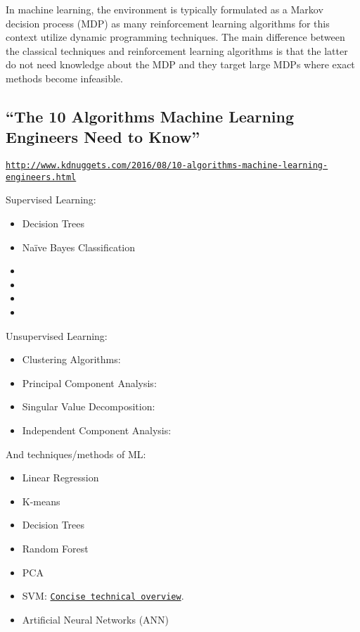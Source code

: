 \documentclass[11pt]{article}
\begin{document}
In machine learning, the environment is typically formulated as a
Markov decision process (MDP) as many reinforcement learning
algorithms for this context utilize dynamic programming
techniques. The main difference between the classical techniques and
reinforcement learning algorithms is that the latter do not need
knowledge about the MDP and they target large MDPs where exact methods
become infeasible.


\subsection*{``The 10 Algorithms Machine Learning Engineers Need to Know''}

\smallskip \smallskip
\noindent
\href{http://www.kdnuggets.com/2016/08/10-algorithms-machine-learning-engineers.html}{{\tt http://www.kdnuggets.com/2016/08/10-algorithms-machine-learning-engineers.html}}

Supervised Learning:\\
\begin{itemize}
\item{Decision Trees}
\item{Naïve Bayes Classification}
\item{}
\item{}
\item{}
\item{}
\end{itemize}

Unsupervised Learning:\\
\begin{itemize}
\item{Clustering Algorithms:}
\item{Principal Component Analysis:}
\item{Singular Value Decomposition:}
\item{Independent Component Analysis:}
\end{itemize}



And techniques/methods of ML:
\begin{itemize}
\item{Linear Regression}
\item{K-means} 
\item{Decision Trees}
\item{Random Forest}
\item{PCA}
\item{SVM: 
\href{http://www.kdnuggets.com/2016/09/support-vector-machines-concise-technical-overview.html}{\tt Concise technical overview}. } 
\item{Artificial Neural Networks (ANN)}
\end{itemize}
\end{document}
